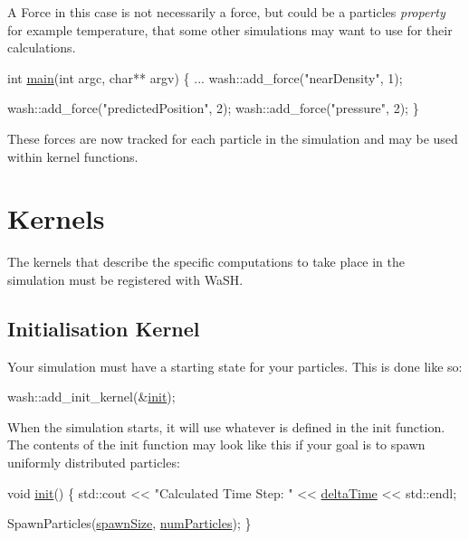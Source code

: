 A \textquotesingle{}Force\textquotesingle{} in this case is not necessarily a force, but could be a particle\textquotesingle{}s {\itshape property} for example temperature, that some other simulations may want to use for their calculations. 
\begin{DoxyCode}
\textcolor{keywordtype}{int} \mbox{\hyperlink{3d__fluid__sim_2fluid__sim_8cpp_a3c04138a5bfe5d72780bb7e82a18e627}{main}}(\textcolor{keywordtype}{int} argc, \textcolor{keywordtype}{char}** argv) \{
    ...
    wash::add\_force(\textcolor{stringliteral}{"nearDensity"}, 1);

    wash::add\_force(\textcolor{stringliteral}{"predictedPosition"}, 2);
    wash::add\_force(\textcolor{stringliteral}{"pressure"}, 2);
\}
\end{DoxyCode}
 These forces are now tracked for each particle in the simulation and may be used within kernel functions.

\section*{Kernels}

The kernels that describe the specific computations to take place in the simulation must be registered with Wa\+SH.

\subsection*{Initialisation Kernel}

Your simulation must have a starting state for your particles. This is done like so\+: 
\begin{DoxyCode}
wash::add\_init\_kernel(&\mbox{\hyperlink{init_8cpp_a9961f7ff0de6fe6ea7838db3950e534f}{init}});
\end{DoxyCode}
 When the simulation starts, it will use whatever is defined in the {\ttfamily init} function. The contents of the {\ttfamily init} function may look like this if your goal is to spawn uniformly distributed particles\+: 
\begin{DoxyCode}
\textcolor{keywordtype}{void} \mbox{\hyperlink{init_8cpp_a9961f7ff0de6fe6ea7838db3950e534f}{init}}() \{
    std::cout << \textcolor{stringliteral}{"Calculated Time Step: "} << \mbox{\hyperlink{3d__fluid__sim_2fluid__sim_8cpp_a78e0adba8d27825f587ec87ed578015f}{deltaTime}} << std::endl;

    SpawnParticles(\mbox{\hyperlink{ca__fluid__sim_2fluid__sim_8cpp_ab17b2a069e81c771262e861e014202d0}{spawnSize}}, \mbox{\hyperlink{3d__fluid__sim_2fluid__sim_8cpp_adfee095e4b276ab10960391284f14410}{numParticles}});
\}
\end{DoxyCode}



